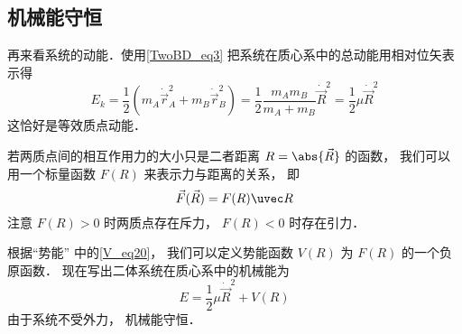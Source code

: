 \subsection{机械能守恒}

再来看系统的动能．使用\autoref{TwoBD_eq3} 把系统在质心系中的总动能用相对位矢表示得
\begin{equation}
E_k = \frac12 (m_A \dot{\vec r}_A^2 + m_B \dot{\vec r}_B^2) = \frac12 \frac{m_A m_B}{m_A + m_B} \dot{\vec  R}^2 = \frac12 \mu \dot{\vec  R}^2
\end{equation}
这恰好是等效质点动能．

若两质点间的相互作用力的大小只是二者距离 $R = \abs{\vec R}$ 的函数， 我们可以用一个标量函数 $F(R)$ 来表示力与距离的关系， 即
\begin{equation}
\vec F(\vec R) = F(R) \uvec R
\end{equation}
注意 $F(R)>0$ 时两质点存在斥力， $F(R)<0$ 时存在引力．

根据“势能” 中的\autoref{V_eq20}， 我们可以定义势能函数 $V(R)$ 为 $F(R)$ 的一个负原函数． 现在写出二体系统在质心系中的机械能为
\begin{equation}
E = \frac12 \mu \dot{\vec  R}^2 + V(R)
\end{equation}
由于系统不受外力， 机械能守恒．